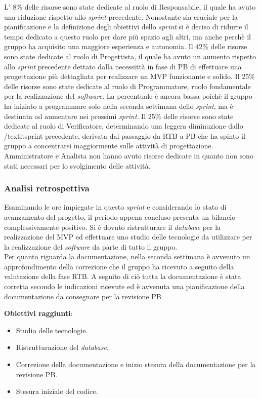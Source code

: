 L' 8\% delle risorse sono state dedicate al ruolo di Responsabile, il quale ha avuto una riduzione rispetto allo \textit{sprint} precedente. Nonostante sia 
cruciale per la pianificazione e la definizione degli obiettivi dello \textit{sprint} si è deciso di ridurre il tempo dedicato a questo ruolo per dare più spazio agli altri, ma anche perchè il gruppo 
ha acquisito una maggiore esperienza e autonomia. Il 42\% delle risorse sono state dedicate al ruolo di Progettista, il quale ha avuto un aumento rispetto allo \textit{sprint} 
precedente dettato dalla necessittà in fase di PB di effettuare una progettazione più dettagliata per realizzare un MVP funzionante e solido.
Il 25\% delle risorse sono state dedicate al ruolo di Programmatore, ruolo fondamentale per la realizzazione del \textit{software}. La percentuale è ancora bassa poichè 
il gruppo ha iniziato a programmare solo nella seconda settimana dello \textit{sprint}, ma è destinata ad aumentare nei prossimi \textit{sprint}. 
Il 25\% delle risorse sono state dedicate al ruolo di Verificatore, determinando una leggera diminuzione dallo /textit{sprint} precedente, derivata dal passaggio da RTB a PB che ha spinto il gruppo a concentrarsi maggiormente sulle attività di progettazione. 
Amministratore e Analista non hanno avuto risorse dedicate in quanto non sono stati necessari per lo svolgimento delle attività.


\subsubsection{Analisi retrospettiva}
Esaminando le ore impiegate in questo \textit{sprint} e considerando lo stato di avanzamento del progetto, il periodo appena concluso presenta un bilancio complessivamente positivo.
Si è dovuto ristrutturare il \textit{database} per la realizzazione del MVP ed effettuare uno studio delle tecnologie da utilizzare per la realizzazione del \textit{software} da parte di tutto il gruppo.\\
Per quanto riguarda la documentazione, nella seconda settimana è avvenuto un approfondimento della correzione che il gruppo ha ricevuto a seguito della valutazione della fase RTB.
A seguito di ciò tutta la documentazione è stata corretta secondo le indicazioni ricevute ed è avvenuta una pianificazione della documentazione da consegnare per la revisione PB.

\textbf{Obiettivi raggiunti}:
\begin{itemize}
	\item Studio delle tecnologie.
	\item Ristrutturazione del \textit{database}.
	\item Correzione della documentazione e inizio stesura della documentazione per la revisione PB.
	\item Stesura iniziale del codice.
\end{itemize}


